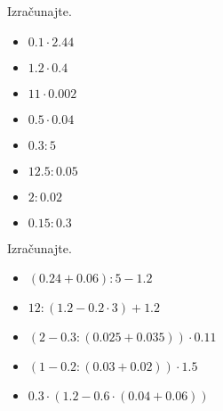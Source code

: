     


    \begin{naloga}
        Izračunajte.
        \begin{itemize}
                    \item $0.1\cdot 2.44$ 
                    \item $1.2\cdot 0.4$ 
                    \item $11\cdot 0.002$ 
                    \item $0.5\cdot 0.04$ 
                    \item $0.3: 5$ 
                    \item $12.5: 0.05$ 
                    \item $2: 0.02$ 
                    \item $0.15: 0.3$ 
        \end{itemize}
    \end{naloga}

    


    \begin{naloga}
        Izračunajte.
        \begin{itemize}
                    \item $\left(0.24 + 0.06\right):5 - 1.2$ 
                    \item $12:\left(1.2- 0.2\cdot 3\right)+1.2$ 
                    \item $\left(2-0.3:\left(0.025 + 0.035\right)\right)\cdot 0.11$ 
                    \item $\left(1-0.2:\left(0.03+0.02\right)\right)\cdot 1.5$ 
                    \item $0.3\cdot\left(1.2-0.6\cdot\left(0.04+0.06\right)\right)$ 
        \end{itemize}
    \end{naloga}

    